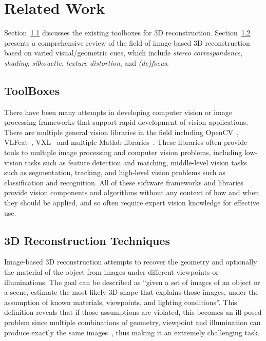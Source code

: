 
\chapter{Related Work}
\label{ch:RelatedWork}
Section~\ref{sec:Toolbox} discusses the existing toolboxes for 3D reconstruction. Section~\ref{sec:3DRecon_Tech} presents a comprehensive review of the field of image-based 3D reconstruction based on varied visual/geometric cues, which include \textit{stereo correspondence}, \textit{shading}, \textit{silhouette}, \textit{texture distortion}, and \textit{(de)focus}.

\section{ToolBoxes}
\label{sec:Toolbox}
There have been many attempts in developing computer vision or image processing frameworks that support rapid development of vision applications. There are multiple general vision libraries in the field including OpenCV~\cite{bradski2008learning}, VLFeat~\cite{vedaldi08vlfeat}, VXL~\cite{vxl17} and multiple Matlab libraries~\cite{KovesiMATLABCode, MariottiniPr_RAM05}. These libraries often provide tools to multiple image processing and computer vision problems, including low-vision tasks such as feature detection and matching, middle-level vision tasks such as segmentation, tracking, and high-level vision problems such as classification and recognition. All of these software frameworks and libraries provide vision components and algorithms without any context of how and when they should be applied, and so often require expert vision knowledge for effective use.

\section{3D Reconstruction Techniques}
\label{sec:3DRecon_Tech}
Image-based 3D reconstruction attempts to recover the geometry and optionally the material of the object from images under different viewpoints or illuminations. The goal can be described as ``given a set of images of an object or a scene, estimate the most likely 3D shape that explains those images, under the assumption of known materials, viewpoints, and lighting conditions''. This definition reveals that if those assumptions are violated, this becomes an ill-posed problem since multiple combinations of geometry, viewpoint and illumination can produce exactly the same images~\cite{poggio1985computational}, thus making it an extremely challenging task.


